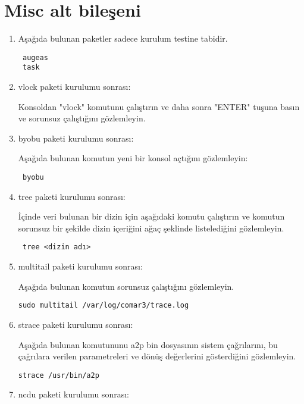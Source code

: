 \documentclass[a4paper,10pt]{article}
\begin{document}
\section{Misc alt bileşeni}
\begin{enumerate}

\item Aşağıda bulunan paketler sadece kurulum testine tabidir.
\begin{verbatim}
 augeas
 task
\end{verbatim}
\item vlock paketi kurulumu sonrası:

Konsoldan "vlock" komutunu çalıştırın ve daha sonra "ENTER" tuşuna basın ve sorunsuz çalıştığını gözlemleyin.


\item byobu paketi kurulumu sonrası:

Aşağıda bulunan komutun yeni bir konsol açtığını gözlemleyin:

\begin{verbatim}
 byobu
\end{verbatim}

\item tree paketi kurulumu sonrası:

İçinde veri bulunan bir dizin için aşağıdaki komutu çalıştırın ve komutun sorunsuz bir şekilde dizin içeriğini ağaç şeklinde listelediğini gözlemleyin.

\begin{verbatim}
 tree <dizin adı>
\end{verbatim}

\item multitail paketi kurulumu sonrası:

Aşağıda bulunan komutun sorunsuz çalıştığını gözlemleyin.
\begin{verbatim}
sudo multitail /var/log/comar3/trace.log 
\end{verbatim}


\item strace paketi kurulumu sonrası: 

Aşağıda bulunan komutununu a2p bin dosyasının sistem çağrılarını, bu çağrılara verilen parametreleri ve dönüş değerlerini gösterdiğini gözlemleyin.
\begin{verbatim}
strace /usr/bin/a2p 
\end{verbatim}



\item ncdu paketi kurulumu sonrası: 


\end{enumerate}
\end{document}
